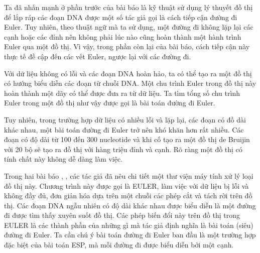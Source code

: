 \documentclass[14pt, a4paper]{article}
\numberwithin{equation}{section}
\numberwithin{figure}{section}
\numberwithin{dl}{section}
\numberwithin{md}{section}
\numberwithin{bd}{section}
\numberwithin{dn}{section}
\numberwithin{hq}{section}
\begin{document}
    Ta đã nhấn mạnh ở phần trước của bài báo là kỹ thuật sử dụng lý thuyết đồ thị để lắp ráp các đoạn DNA được một số tác giả gọi là cách tiếp cận đường đi Euler.
    Tuy nhiên, theo thuật ngữ mà ta sử dụng, một đường đi không lặp lại các cạnh hoặc các đỉnh nên không phải lúc nào cũng hoàn thành một hành trình Euler qua một đồ thị.
    Vì vậy, trong phần còn lại của bài báo, cách tiếp cận này thực tế đề cập đến các vết Euler, ngược lại với các đường đi.

    Với dữ liệu không có lỗi và các đoạn DNA hoàn hảo, ta có thể tạo ra một đồ thị có hướng biểu diễn các đoạn từ chuỗi DNA.
    Một chu trình Euler trong đồ thị này hoàn thành một dãy có thể được đưa ra từ dữ liệu.
    Ta tìm tổng số chu trình Euler trong một đồ thị như vậy được gọi là bài toán đường đi Euler.

    Tuy nhiên, trong trường hợp dữ liệu có nhiều lỗi và lặp lại, các đoạn có đồ dài khác nhau, một bài toán đường đi Euler trở nên khó khăn hơn rất nhiều.
    Các đoạn có độ dài từ 100 đến 300 nucleotide và khi cố tạo ra một đồ thị de Bruijin với 20 bộ sẽ tạo ra đồ thị với hàng triệu đỉnh và cạnh.
    Rõ ràng một đồ thị có tính chất này không dễ dàng làm việc.

    Trong hai bài báo \cite{pevzner2001eulerian}, \cite{pevzner2001new}, các tác giả đã nêu chi tiết một thư viện máy tính xử lý loại đồ thị này.
    Chương trình này được gọi là EULER, làm việc với dữ liệu bị lỗi và không đầy đủ, đơn giản hóa dựa trên một chuỗi các phép cắt và tách rời trên đồ thị.
    Các đoạn DNA ngẫu nhiên có độ dài khác nhau được biểu diễn là một đường đi được tìm thấy xuyên suốt đồ thị.
    Các phép biến đổi này trên đồ thị trong EULER là các thành phần của những gì mà tác giả định nghĩa là bài toán (siêu) đường đi Euler.
    Ta cần chú ý bài toán đường đi Euler ban đầu là một trường hợp đặc biệt của bài toán ESP, mà mỗi đường đi được biểu diễn bởi một cạnh.
\end{document}
